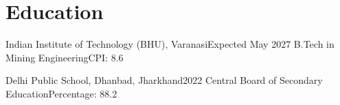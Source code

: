 \section{Education}
    \resumeSubHeadingListStart

    \resumeSubheading
    {Indian Institute of Technology (BHU), Varanasi}{Expected May 2027}
    {B.Tech in Mining Engineering}{CPI: 8.6}
    
    \vspace{3mm}
    
    \resumeSubheading
    {Delhi Public School, Dhanbad, Jharkhand}{2022}
    {Central Board of Secondary Education}{Percentage: 88.2}
    \resumeSubHeadingListEnd